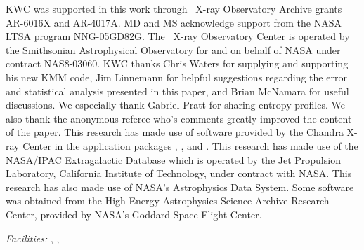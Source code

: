 \documentclass[12pt,preprint]{aastex}
\begin{document}
KWC was supported in this work through \chandra\ X-ray Observatory
Archive grants AR-6016X and AR-4017A. MD and MS acknowledge support
from the NASA LTSA program NNG-05GD82G. The \chandra\ X-ray
Observatory Center is operated by the Smithsonian Astrophysical
Observatory for and on behalf of NASA under contract NAS8-03060. KWC
thanks Chris Waters for supplying and supporting his new KMM code, Jim
Linnemann for helpful suggestions regarding the error and statistical
analysis presented in this paper, and Brian McNamara for useful
discussions. We especially thank Gabriel Pratt for sharing entropy
profiles. We also thank the anonymous referee who's comments greatly
improved the content of the paper. This research has made use of
software provided by the Chandra X-ray Center in the application
packages \ciao, \chips, and \sherpa. This research has made use of the
NASA/IPAC Extragalactic Database which is operated by the Jet
Propulsion Laboratory, California Institute of Technology, under
contract with NASA. This research has also made use of NASA's
Astrophysics Data System. Some software was obtained from the High
Energy Astrophysics Science Archive Research Center, provided by
NASA's Goddard Space Flight Center.

{\it Facilities:} , , 
\end{document}
